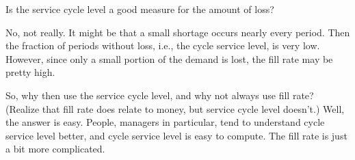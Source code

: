 \begin{question}
  Is the service cycle level a good measure for the  amount of loss?
  \begin{solution}
    No, not really. It might be that a small shortage occurs nearly
    every period. Then the fraction of periods without loss, i.e., the
    cycle service level, is very low. However, since only a small
    portion of the demand is lost, the fill rate may be pretty high. 

    So, why then use the service cycle level, and why not always use
    fill rate? (Realize that fill rate does relate to money, but
    service cycle level doesn't.) Well, the answer is easy. People,
    managers in particular, tend to understand cycle service level
    better, and cycle service level is easy to compute. The fill rate
    is just a bit more complicated. 
  \end{solution}
\end{question}

